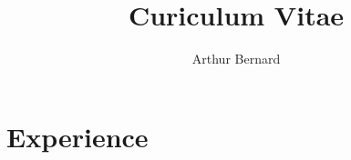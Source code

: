 \documentclass[a4paper,11pt]{arthur-cv}
\title{Curiculum Vitae}
\author{Arthur Bernard}
\begin{document}
\makeprofile %

\section{Experience}
\end{document}

